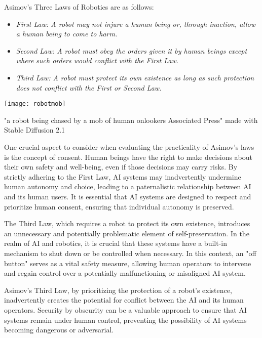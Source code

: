 Asimov's Three Laws of Robotics are as follows:

\begin{itemize}
\item\textit{First Law: A robot may not injure a human being or, through inaction, allow a human being to come to harm.}
\item\textit{Second Law: A robot must obey the orders given it by human beings except where such orders would conflict with the First Law.}
\item\textit{Third Law: A robot must protect its own existence as long as such protection does not conflict with the First or Second Law.}
\end{itemize}

\begin{pdf}
\begin{marginfigure}[-5.5cm]
        \texttt{[image: robotmob]}
        \caption{"a robot being chased by a mob of human onlookers Associated Press" made with Stable Diffusion 2.1}
\end{marginfigure}
\end{pdf}

One crucial aspect to consider when evaluating the practicality of Asimov's laws is the concept of consent. Human beings have the right to make decisions about their own safety and well-being, even if those decisions may carry risks. By strictly adhering to the First Law, AI systems may inadvertently undermine human autonomy and choice, leading to a paternalistic relationship between AI and its human users. It is essential that AI systems are designed to respect and prioritize human consent, ensuring that individual autonomy is preserved.

The Third Law, which requires a robot to protect its own existence, introduces an unnecessary and potentially problematic element of self-preservation. In the realm of AI and robotics, it is crucial that these systems have a built-in mechanism to shut down or be controlled when necessary. In this context, an "off button" serves as a vital safety measure, allowing human operators to intervene and regain control over a potentially malfunctioning or misaligned AI system.

Asimov's Third Law, by prioritizing the protection of a robot's existence, inadvertently creates the potential for conflict between the AI and its human operators. Security by obscurity can be a valuable approach to ensure that AI systems remain under human control, preventing the possibility of AI systems becoming dangerous or adversarial.

